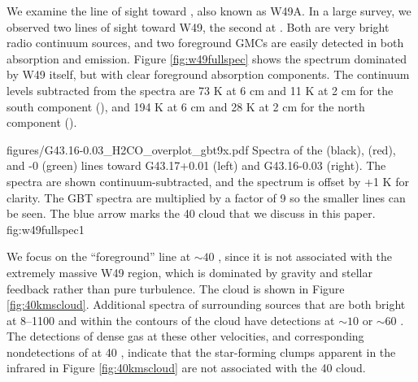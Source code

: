 

We examine the line of sight toward \north, also known as W49A.  In a large
survey, we observed two lines of sight toward W49, the second at \south.  Both
are very bright radio continuum sources, and two foreground GMCs are easily
detected in both \formaldehyde absorption and \thirteenco emission.  Figure
\ref{fig:w49fullspec} shows the spectrum dominated by W49 itself, but with
clear \formaldehyde foreground absorption components.  The continuum levels
subtracted from the spectra are 73 K at 6 cm and 11 K at 2 cm for the south
component (\south), and 194 K at 6 cm and 28 K at 2 cm for the north component
(\north).


          {figures/G43.16-0.03_H2CO_overplot_gbt9x.pdf}
{Spectra of the \formaldehyde \oneone (black), \twotwo (red), and -0 (green) lines toward G43.17+0.01 (left) and G43.16-0.03 (right).
The \formaldehyde spectra are shown continuum-subtracted, and the \thirteenco
spectrum is offset by +1 K for clarity.  The GBT \twotwo spectra are multiplied
by a factor of 9 so the smaller lines can be seen.  The blue arrow marks the 40 \kms
cloud \GRSMC that we discuss in this paper. %
}{fig:w49fullspec}{1}

We focus on the ``foreground'' line at $\sim40$ \kms, since it is not
associated with the extremely massive W49 region, which is dominated by gravity
and stellar feedback rather than pure turbulence.  The cloud is shown in Figure
\ref{fig:40kmscloud}.  
Additional \formaldehyde spectra of surrounding sources that are both bright at
8--1100 \um and within the \thirteenco contours of the cloud have \formaldehyde
\twotwo detections at $\sim 10$ or $\sim 60$ \kms. The detections of dense gas
at these other velocities, and corresponding nondetections of \twotwo at 40
\kms, indicate that the star-forming clumps apparent in the infrared in Figure
\ref{fig:40kmscloud} are not associated with the 40 \kms cloud.  

